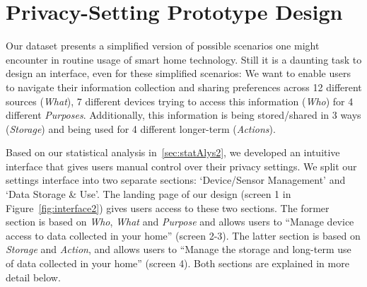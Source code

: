 %
%

\section{Privacy-Setting Prototype Design}\label{sec:design_stat}

Our dataset presents a simplified version of possible scenarios one might encounter in routine usage of smart home technology. Still it is a daunting task to design an interface, even for these simplified scenarios: We want to enable users to navigate their information collection and sharing preferences across 12 different sources (\emph{What}), 7 different devices trying to access this information (\emph{Who}) for 4 different \emph{Purposes}. Additionally, this information is being stored/shared in 3 ways (\emph{Storage}) and being used for 4 different longer-term (\emph{Actions}). 

Based on our statistical analysis in~\ref{sec:statAlys2}, we developed an intuitive interface that gives users manual control over their privacy settings. We split our settings interface into two separate sections: `Device/Sensor Management' and `Data Storage \& Use'. The landing page of our design (screen 1 in Figure~\ref{fig:interface2}) gives users access to these two sections. The former section is based on \emph{Who}, \emph{What} and \emph{Purpose} and allows users to ``Manage device access to data collected in your home'' (screen 2-3). The latter section is based on \emph{Storage} and \emph{Action}, and allows users to ``Manage the storage and long-term use of data collected in your home'' (screen 4). Both sections are explained in more detail below.

